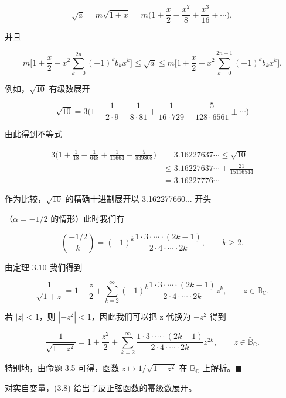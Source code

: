 \begin{example}
\begin{items}
\[
\sqrt{a}=m\sqrt{1+x}=m\Big(1+\frac{x}{2}-\frac{x^{2}}{8}+\frac{x^{3}}{16}\mp\cdots\Big),
\]

并且

\[
m\Big[1+\frac{x}{2}-x^{2}\sum_{k=0}^{2n}(-1)^{k}b_{k}x^{k}\Big]\leq\sqrt{a}\leq m\Big[1+\frac{x}{2}-x^{2}\sum_{k=0}^{2n+1}(-1)^{k}b_{k}x^{k}\Big].
\]

例如，$ \sqrt{10} $ 有级数展开

\[
\sqrt{10}=3\Big(1+\frac{1}{2\cdot9}-\frac{1}{8\cdot81}+\frac{1}{16\cdot729}-\frac{5}{128\cdot6561}\pm\cdots\Big)
\]

由此得到不等式

\begin{equation*}
\begin{aligned}
3\Big(1+\frac{1}{18}-\frac{1}{648}+\frac{1}{11664}-\frac{5}{839808}\Big)&=3.16227637\cdots\leq\sqrt{10}\\&\leq3.16227637\cdots+\frac{21}{15116544}\\&=3.16227776\cdots
\end{aligned}
\end{equation*}

作为比较，$ \sqrt{10} $ 的精确十进制展开以 3.162277660... 开头

\item

（$ \alpha = -1/2 $ 的情形）此时我们有

\[
\binom{-1/2}{k}=(-1)^{k}\frac{1\cdot3\cdot\cdots\cdot(2k-1)}{2\cdot4\cdot\cdots\cdot2k},\qquad k\geq2.
\]

由定理 3.10 我们得到

\[
\frac{1}{\sqrt{1+z}}=1-\frac{z}{2}+\sum_{k=2}^{\infty}(-1)^{k}\frac{1\cdot3\cdot\cdots\cdot(2k-1)}{2\cdot4\cdot\cdots\cdot2k}z^{k},\qquad z\in\bar{\mathbb{B}}_{\mathbb{C}}.
\]

若 $ |z| < 1 $，则 $ |-z^2| < 1 $，因此我们可以把 z 代换为 $ -z^2 $ 得到

\begin{equation}
\frac{1}{\sqrt{1-z^{2}}}=1+\frac{z^{2}}{2}+\sum_{k=2}^{\infty}\frac{1\cdot3\cdot\cdots\cdot(2k-1)}{2\cdot4\cdot\cdots\cdot2k}z^{2k},\qquad z\in\bar{\mathbb{B}}_{\mathbb{C}}.
\end{equation}

特别地，由命题 3.5 可得，函数 $ z \mapsto 1 / \sqrt{1 - z^2} $ 在 $ \mathbb{B}_{\mathbb{C}} $ 上解析。$ \blacksquare $

\end{items}

对实自变量，(3.8) 给出了反正弦函数的幂级数展开。

\end{example}

